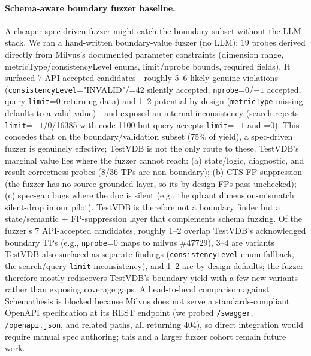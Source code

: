 \documentclass[sigconf]{acmart}
\begin{document}
\paragraph{Schema-aware boundary fuzzer baseline.} A cheaper spec-driven fuzzer might catch the boundary subset without the LLM stack. We ran a hand-written boundary-value fuzzer (no LLM): 19 probes derived directly from Milvus's documented parameter constraints (dimension range, metricType/consistencyLevel enums, limit/nprobe bounds, required fields). It surfaced 7 API-accepted candidates---roughly 5--6 likely genuine violations (\texttt{consistencyLevel}="INVALID"/=42 silently accepted, \texttt{nprobe}=0/$-1$ accepted, query \texttt{limit}=0 returning data) and 1--2 potential by-design (\texttt{metricType} missing defaults to a valid value)---and exposed an internal inconsistency (search rejects \texttt{limit}=$-1$/0/16385 with code 1100 but query accepts \texttt{limit}=$-1$ and =0). This concedes that on the boundary/validation subset (75\% of yield), a spec-driven fuzzer is genuinely effective; TestVDB is not the only route to these. TestVDB's marginal value lies where the fuzzer cannot reach: (a) state/logic, diagnostic, and result-correctness probes (8/36 TPs are non-boundary); (b) CTS FP-suppression (the fuzzer has no source-grounded layer, so its by-design FPs pass unchecked); (c) spec-gap bugs where the doc is silent (e.g., the qdrant dimension-mismatch silent-drop in our pilot). TestVDB is therefore not a boundary finder but a state/semantic + FP-suppression layer that complements schema fuzzing. Of the fuzzer's 7 API-accepted candidates, roughly 1--2 overlap TestVDB's acknowledged boundary TPs (e.g., \texttt{nprobe}=0 maps to milvus \#47729), 3--4 are variants TestVDB also surfaced as separate findings (\texttt{consistencyLevel} enum fallback, the search/query \texttt{limit} inconsistency), and 1--2 are by-design defaults; the fuzzer therefore mostly rediscovers TestVDB's boundary yield with a few new variants rather than exposing coverage gaps. A head-to-head comparison against Schemathesis is blocked because Milvus does not serve a standards-compliant OpenAPI specification at its REST endpoint (we probed \texttt{/swagger}, \texttt{/openapi.json}, and related paths, all returning 404), so direct integration would require manual spec authoring; this and a larger fuzzer cohort remain future work.
\end{document}
